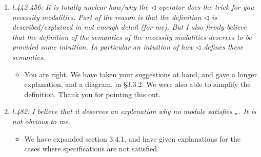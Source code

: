 \documentclass[11pt]{amsart}
\begin{document}
\begin{enumerate}
\item
\emph{
l.442-456: It is totally unclear how/why the $\triangleleft$-operator does the trick for you necessity modalities. Part of the reason is that the definition $\triangleleft$ is described/explained in not enough detail (for me). But I also firmly believe that the definition of the semantics of the necessity modalities deserves to be provided some intuition. In particular an intuition of how $\triangleleft$ defines these semantics.
}

\begin{itemize}
\item You are right. We have taken your suggestions at hand, and gave a longer explanation, and a diagram, in \S 3.3.2. We were also able to simplify the definition. Thank you for pointing this out.
\end{itemize}

\item
\emph{
l.482: I believe that it deserves an explenation why no module satisfies $_{\texttt{c}}$. It is not obvious to me.
}
\begin{itemize}
\item We have expanded section 3.4.1, and have given explanations for the cases where specifications are not satisfied.
\end{itemize}
\end{enumerate}
\end{document}
